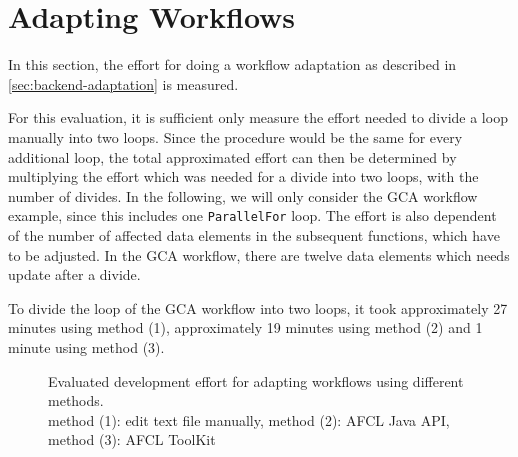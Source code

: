 \documentclass[a4paper,top=25mm,bottom=25mm,12pt,pdftex,halfparskip,twoside,bibtotoc,numbers=noenddot]{scrbook}
\begin{document}
\section{Adapting Workflows}
\label{sec:evaluation-adapting}

In this section, the effort for doing a workflow adaptation as described in \ref{sec:backend-adaptation} is measured.

For this evaluation, it is sufficient only measure the effort needed to divide a loop manually into two loops. Since the procedure would be the same for every additional loop, the total approximated effort can then be determined by multiplying the effort which was needed for a divide into two loops, with the number of divides.
In the following, we will only consider the GCA workflow example, since this includes one \texttt{ParallelFor} loop.
The effort is also dependent of the number of affected data elements in the subsequent functions, which have to be adjusted. In the GCA workflow, there are twelve data elements which needs update after a divide.

To divide the loop of the GCA workflow into two loops, it took approximately 27 minutes using method (1), approximately 19 minutes using method (2) and 1 minute using method (3).

\begin{figure}[h]
\caption{Evaluated development effort for adapting workflows using different methods.\\ \small{method (1): edit text file manually, method (2): AFCL Java API, method (3): AFCL ToolKit}}
\label{fig:evaluation-adaptation}
\end{figure}

\end{document}
